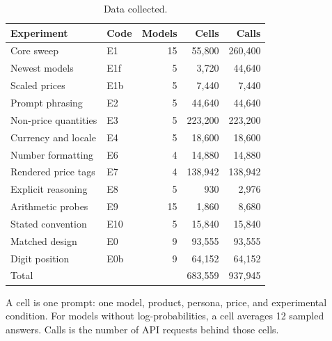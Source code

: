 \begin{table}[t]
\centering
\caption{Data collected.}
\label{tab:coverage}
\small
\begin{tabular}{llrrr}
\toprule
Experiment & Code & Models & Cells & Calls \\
\midrule
Core sweep & E1 & 15 &  55,800 & 260,400 \\
Newest models & E1f & 5 &   3,720 &  44,640 \\
Scaled prices & E1b & 5 &   7,440 &   7,440 \\
Prompt phrasing & E2 & 5 &  44,640 &  44,640 \\
Non-price quantities & E3 & 5 & 223,200 & 223,200 \\
Currency and locale & E4 & 5 &  18,600 &  18,600 \\
Number formatting & E6 & 4 &  14,880 &  14,880 \\
Rendered price tags & E7 & 4 & 138,942 & 138,942 \\
Explicit reasoning & E8 & 5 &     930 &   2,976 \\
Arithmetic probes & E9 & 15 &   1,860 &   8,680 \\
Stated convention & E10 & 5 &  15,840 &  15,840 \\
Matched design & E0 & 9 &  93,555 &  93,555 \\
Digit position & E0b & 9 &  64,152 &  64,152 \\
\midrule
\multicolumn{2}{l}{Total} & & 683,559 & 937,945 \\
\bottomrule
\end{tabular}
\vspace{2pt}
\parbox{\linewidth}{\footnotesize A cell is one prompt: one model, product, persona, price, and experimental condition. For models without log-probabilities, a cell averages 12 sampled answers. Calls is the number of API requests behind those cells.}
\end{table}
